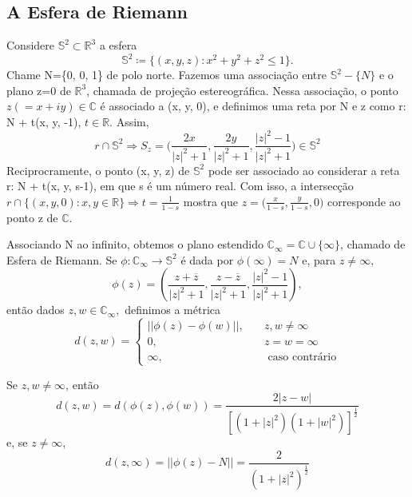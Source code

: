 \documentclass[ComplexAnalysis/complex.tex]{subfiles}
\begin{document}
\subsection{A Esfera de Riemann}
Considere $\mathbb{S}^{2}\subset{\mathbb{R}^{3}}$ a esfera
$$
	\mathbb{S}^{2}\coloneqq  \{(x, y, z): x ^{2} + y ^{2} + z ^{2}\leq{1}\}.
$$
Chame N=\{0, 0, 1\} de polo norte. Fazemos uma associação entre $\mathbb{S}^{2}-\{N\}$ e o plano z=0 de $\mathbb{R}^{3}$,
chamada de projeção estereográfica. Nessa associação, o ponto $z(=x + iy)\in\mathbb{C}$ é associado a (x, y, 0), e
definimos uma reta por N e z como r: N + t(x, y, -1), $t\in \mathbb{R}$. Assim,
$$
	r\cap{\mathbb{S}^{2}} \Rightarrow S _{z} = \biggl(\frac{2x}{|z|^{2}+1}, \frac{2y}{|z|^{2}+1}, \frac{|z|^{2}-1}{|z|^{2}+1}\biggr)\in \mathbb{S}^{2}
$$
Reciprocramente, o ponto (x, y, z) de $\mathbb{S}^{2}$ pode ser associado ao considerar a reta r: N + t(x, y, s-1), em que
s é um número real. Com isso, a intersecção $r\cap \{(x, y, 0): x, y \in \mathbb{R}\}\Rightarrow t=\frac{1}{1-s}$ mostra que
$z = \biggl(\frac{x}{1-s}, \frac{y}{1-s}, 0\biggr)$ corresponde ao ponto z de $\mathbb{C}$.

Associando N ao infinito, obtemos o plano estendido $\mathbb{C}_{\infty} = \mathbb{C}\cup \{\infty\}$, chamado de Esfera de Riemann. Se $\phi:\mathbb{C}_{\infty}\rightarrow \mathbb{S}^{2}$
é dada por $\phi(\infty) = N$ e, para $z\neq{\infty},$
$$
	\phi(z) = (\frac{z + \overline{z}}{|z|^{2} + 1}, \frac{z - \overline{z}}{|z|^{2}+1}, \frac{|z|^{2}-1}{|z|^{2}+1}),
$$
então dados $z, w\in \mathbb{C}_{\infty},$ definimos a métrica
$$
	d(z, w)=\left\{
	\begin{array}{ll}
		||\phi(z) - \phi(w)||, & \quad z, w\neq{\infty}       \\
		0,                     & \quad z = w = \infty         \\
		\infty,                & \quad \text{ caso contrário}
	\end{array}\right.
$$
\begin{example}
	Se $z, w\neq{\infty}$, então
	$$
		d(z, w) = d(\phi(z), \phi(w)) = \frac{2|z - w|}{[(1+|z|^{2})(1+|w|^{2})]^{\frac{1}{2}}}
	$$
	e, se $z\neq\infty$,
	$$
		d(z, \infty) = ||\phi(z) - N|| = \frac{2}{(1+|z|^{2})^{\frac{1}{2}}}
	$$
\end{example}
\end{document}
